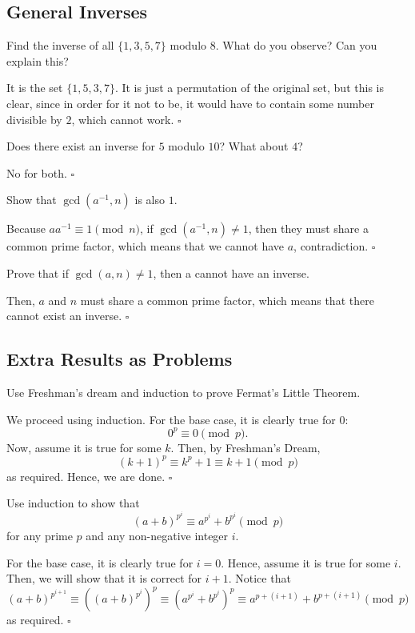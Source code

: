 \documentclass{article}
\begin{document}
\subsection{General Inverses}

\begin{problem}[2.11.1]{}
Find the inverse of all $\{1, 3, 5, 7\}$ modulo $8$. What do you observe? Can you explain this?
\end{problem}
It is the set $\{1, 5, 3, 7\}$. It is just a permutation of the original set, but this is clear, since in order for it not to be, it would have to contain some number divisible by $2$, which cannot work. $\square$

\begin{problem}[2.11.2]{}
Does there exist an inverse for $5$ modulo $10$? What about $4$?
\end{problem}
No for both. $\square$

\begin{problem}[2.11.3]{}
Show that $\gcd(a^{-1}, n)$ is also $1$.
\end{problem}
Because $aa^{-1} \equiv 1 \pmod{n}$, if $\gcd(a^{-1}, n) \neq 1$, then they must share a common prime factor, which means that we cannot have $a$, contradiction. $\square$

\begin{problem}[2.11.4]{}
Prove that if $\gcd(a, n) \neq 1$, then a cannot have an inverse.
\end{problem}
Then, $a$ and $n$ must share a common prime factor, which means that there cannot exist an inverse. $\square$

\subsection{Extra Results as Problems}

\begin{problem}[2.12.1]{}
Use Freshman's dream and induction to prove Fermat's Little Theorem.
\end{problem}
We proceed using induction. For the base case, it is clearly true for $0$: \[0^p \equiv 0 \pmod{p}.\] Now, assume it is true for some $k$. Then, by Freshman's Dream, \[(k+1)^p \equiv k^p + 1 \equiv k+1 \pmod{p}\] as required. Hence, we are done. $\square$

\begin{problem}[2.12.2]{}
Use induction to show that \[(a + b)^{p^i} \equiv a^{p^i} + b^{p^i} \pmod{p}\] for any prime $p$ and any non-negative integer $i$.
\end{problem}
For the base case, it is clearly true for $i=0$. Hence, assume it is true for some $i$. Then, we will show that it is correct for $i+1$. Notice that \[(a+b)^{p^{i+1}} \equiv \left((a+b)^{p^i}\right)^p \equiv \left(a^{p^i}+b^{p^i}\right)^p \equiv a^{p+(i+1)}+b^{p+(i+1)} \pmod{p}\] as required. $\square$
\end{document}

